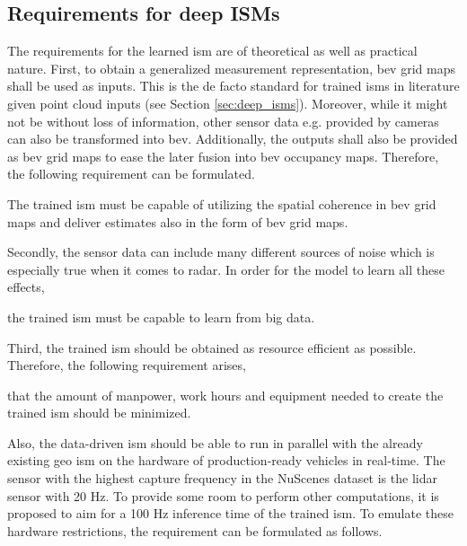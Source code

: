 \subsection{Requirements for deep ISMs}
\label{subsec:requirements_for_ev_representation}
The requirements for the learned \gls{ism} are of theoretical as well as practical nature. First, to obtain a generalized measurement representation, \gls{bev} grid maps shall be used as inputs. This is the de facto standard for trained \gls{ism}s in literature given point cloud inputs (see Section \ref{sec:deep_isms}). Moreover, while it might not be without loss of information, other sensor data e.g. provided by cameras can also be transformed into \gls{bev}. Additionally, the outputs shall also be provided as \gls{bev} grid maps to ease the later fusion into \gls{bev} occupancy maps. Therefore, the following requirement can be formulated.
\\
\setcounter{req}{1}
\setcounter{subreq}{0}
\begin{subreq} \label{subreq:input_output}
	The trained \gls{ism} must be capable of utilizing the spatial coherence in \gls{bev} grid maps and deliver estimates also in the form of \gls{bev} grid maps.
\end{subreq}
Secondly, the sensor data can include many different sources of noise which is especially true when it comes to radar. In order for the model to learn all these effects, 
\\
\begin{subreq} \label{subreq:big_data}
	the trained \gls{ism} must be capable to learn from big data.
\end{subreq}
Third, the trained \gls{ism} should be obtained as resource efficient as possible. Therefore, the following requirement arises, 
\\
\begin{subreq} \label{subreq:min_requirements}
	that the amount of manpower, work hours and equipment needed to create the trained \gls{ism} should be minimized.
\end{subreq}
Also, the data-driven \gls{ism} should be able to run in parallel with the already existing geo \gls{ism} on the hardware of production-ready vehicles in real-time. The sensor with the highest capture frequency in the NuScenes dataset is the lidar sensor with 20 Hz. To provide some room to perform other computations, it is proposed to aim for a 100 Hz inference time of the trained \gls{ism}. To emulate these hardware restrictions, the requirement can be formulated as follows.

